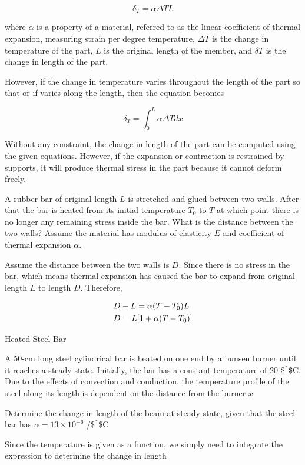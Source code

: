 \documentclass[a4paper,openany,12pt]{book}
\begin{document}
$$\delta _T = \alpha \Delta TL$$

where \(\alpha\) is a property of a material, referred to as the linear
coefficient of thermal expansion, measuring strain per degree
temperature, \(\Delta T\) is the change in temperature of the part, \(L\) is
the original length of the member, and \(\delta T\) is the change in
length of the part.

However, if the change in temperature varies throughout the length of
the part so that or if varies along the length, then the equation
becomes

$$\delta _T = \int_0^L \alpha \Delta Tdx$$

Without any constraint, the change in length of the part can be computed
using the given equations. However, if the expansion or contraction is
restrained by supports, it will produce thermal stress in the part
because it cannot deform freely.

A rubber bar of original length \(L\) is stretched and glued between two
walls. After that the bar is heated from its initial temperature \(T_0\)
to \(T\) at which point there is no longer any remaining stress inside the
bar. What is the distance between the two walls? Assume the material has
modulus of elasticity \(E\) and coefficient of thermal expansion \(\alpha\).


Assume the distance between the two walls is \(D\). Since there is no
stress in the bar, which means thermal expansion has caused the bar to
expand from original length \(L\) to length \(D\). Therefore,

$$\begin{gathered}
  D - L = \alpha (T - T_0)L \hfill \\
  D = L[1 + \alpha (T - T_0)] \hfill \\ 
\end{gathered}$$

Heated Steel Bar

A 50-cm long steel cylindrical bar is heated on one end by a bunsen
burner until it reaches a steady state. Initially, the bar has a
constant temperature of 20 \$\(^{\^{}}\)\$C. Due to the effects of convection
and conduction, the temperature profile of the steel along its length is
dependent on the distance from the burner \(x\)


Determine the change in length of the beam at steady state, given that
the steel bar has \(\alpha = 13 \times 10^{-6}\) /\$\(^{\^{}}\)\$C

Since the temperature is given as a function, we simply need to
integrate the expression to determine the change in length
\end{document}
